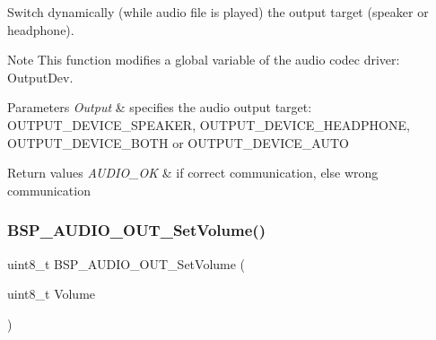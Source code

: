 Switch dynamically (while audio file is played) the output target (speaker or headphone). 

\begin{DoxyNote}{Note}
This function modifies a global variable of the audio codec driver\+: Output\+Dev. 
\end{DoxyNote}

\begin{DoxyParams}{Parameters}
{\em Output} & specifies the audio output target\+: O\+U\+T\+P\+U\+T\+\_\+\+D\+E\+V\+I\+C\+E\+\_\+\+S\+P\+E\+A\+K\+ER, O\+U\+T\+P\+U\+T\+\_\+\+D\+E\+V\+I\+C\+E\+\_\+\+H\+E\+A\+D\+P\+H\+O\+NE, O\+U\+T\+P\+U\+T\+\_\+\+D\+E\+V\+I\+C\+E\+\_\+\+B\+O\+TH or O\+U\+T\+P\+U\+T\+\_\+\+D\+E\+V\+I\+C\+E\+\_\+\+A\+U\+TO \\
\hline
\end{DoxyParams}

\begin{DoxyRetVals}{Return values}
{\em A\+U\+D\+I\+O\+\_\+\+OK} & if correct communication, else wrong communication \\
\hline
\end{DoxyRetVals}
\mbox{\label{group___s_t_m32_f4___d_i_s_c_o_v_e_r_y___a_u_d_i_o___o_u_t___exported___functions_ga2929e2c81c7ca31f8f52622a06ab4900}} 
\subsubsection{\texorpdfstring{B\+S\+P\+\_\+\+A\+U\+D\+I\+O\+\_\+\+O\+U\+T\+\_\+\+Set\+Volume()}{BSP\_AUDIO\_OUT\_SetVolume()}}
{\footnotesize\ttfamily uint8\+\_\+t B\+S\+P\+\_\+\+A\+U\+D\+I\+O\+\_\+\+O\+U\+T\+\_\+\+Set\+Volume (\begin{DoxyParamCaption}\item[{uint8\+\_\+t}]{Volume }\end{DoxyParamCaption})}



